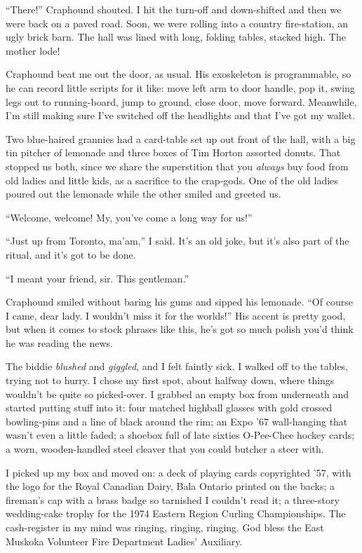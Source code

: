 ``There!'' Craphound shouted. I hit the turn-off and down-shifted
and then we were back on a paved road. Soon, we were rolling into a
country fire-station, an ugly brick barn. The hall was lined with
long, folding tables, stacked high. The mother lode!

Craphound beat me out the door, as usual. His exoskeleton is
programmable, so he can record little scripts for it like: move
left arm to door handle, pop it, swing legs out to running-board,
jump to ground, close door, move forward. Meanwhile, I'm still
making sure I've switched off the headlights and that I've got my
wallet.

Two blue-haired grannies had a card-table set up out front of the
hall, with a big tin pitcher of lemonade and three boxes of Tim
Horton assorted donuts. That stopped us both, since we share the
superstition that you \emph{always} buy food from old ladies and
little kids, as a sacrifice to the crap-gods. One of the old ladies
poured out the lemonade while the other smiled and greeted us.

``Welcome, welcome! My, you've come a long way for us!''

``Just up from Toronto, ma'am,'' I said. It's an old joke, but it's
also part of the ritual, and it's got to be done.

``I meant your friend, sir. This gentleman.''

Craphound smiled without baring his gums and sipped his lemonade.
``Of course I came, dear lady. I wouldn't miss it for the worlds!''
His accent is pretty good, but when it comes to stock phrases like
this, he's got so much polish you'd think he was reading the news.

The biddie \emph{blushed} and \emph{giggled}, and I felt faintly
sick. I walked off to the tables, trying not to hurry. I chose my
first spot, about halfway down, where things wouldn't be quite so
picked-over. I grabbed an empty box from underneath and started
putting stuff into it: four matched highball glasses with gold
crossed bowling-pins and a line of black around the rim; an Expo
'67 wall-hanging that wasn't even a little faded; a shoebox full of
late sixties O-Pee-Chee hockey cards; a worn, wooden-handled steel
cleaver that you could butcher a steer with.

I picked up my box and moved on: a deck of playing cards
copyrighted
'57, with the logo for the Royal Canadian Dairy, Bala Ontario printed 
on the backs; a fireman's cap with a brass badge so tarnished I couldn't 
read it; a three-story wedding-cake trophy for the 1974 Eastern Region 
Curling Championships. The cash-register in my mind was ringing, ringing, 
ringing. God bless the East Muskoka Volunteer Fire Department Ladies'
Auxiliary.

